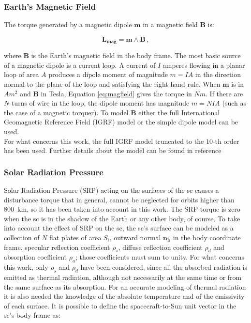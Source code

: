 \subsubsection{Earth's Magnetic Field}
The torque generated by a magnetic dipole $\mathbf{m}$ in a magnetic field $\mathbf{B}$ is:

\begin{equation}
  \mathbf{L_{mag}} = \mathbf{m} \wedge \mathbf{B} \,,
  \label{eq:magfield}
\end{equation}

where $\mathbf{B}$ is the Earth's magnetic field in the body frame.
The most basic source of a magnetic dipole is a current loop. A current of $I$ amperes flowing in a planar loop of area $A$ produces a dipole moment of magnitude $m=IA$ in the direction normal to the plane of the loop and satisfying the right-hand rule.
When $\mathbf{m}$ is in $Am^2$ and $\mathbf{B}$ in Tesla, Equation \eqref{eq:magfield} gives the torque in $Nm$. If there are $N$ turns of wire in the loop, the dipole moment has magnitude $m=NIA$ (such as the case of a magnetic torquer).
To model $\mathbf{B}$ either the full International Geomagnetic Reference Field (IGRF) model or the simple dipole model can be used.\\
For what concerns this work, the full IGRF model truncated to the $10$-th order has been used. Further details about the model can be found in reference \cite{Davis2014}

\subsubsection{Solar Radiation Pressure}
Solar Radiation Pressure (SRP) acting on the surfaces of the \acrshort{sc} causes a disturbance torque that in general, cannot be neglected for orbits higher than \SI{800}{\kilo\meter}, so it has been taken into account in this work.
The SRP torque is zero when the \acrshort{sc} is in the shadow of the Earth or any other body, of course.
To take into account the effect of SRP on the \acrshort{sc}, the \acrshort{sc}'s surface can be modeled as a collection of $N$ flat plates of area $S_{i}$, outward normal $\mathbf{n_{b}}$ in the body coordinate frame, specular reflection coefficient $\rho_s$, diffuse reflection coefficient $\rho_{d}$ and absorption coefficient $\rho_{a}$; those coefficients must sum to unity.
For what concerns this work, only $\rho_s$ and $\rho_d$ have been considered, since all the absorbed radiation is emitted as thermal radiation,  although not necessarily at the same time or from the same surface as its absorption.
For an accurate modeling of thermal radiation it is also needed the knowledge of the absolute temperature and of the emissivity of each surface.
It is possible to define the spacecraft-to-Sun unit vector in the \acrshort{sc}'s body frame as:

